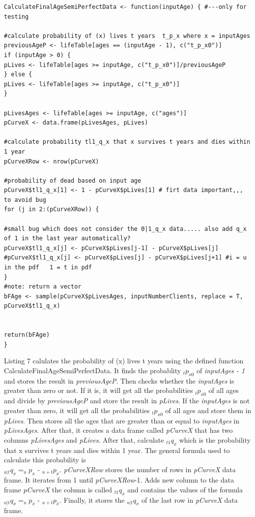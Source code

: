 \documentclass[12pt]{article}
\def\StartLineAtOne{\lstset{firstnumber=1}}
\begin{document}
\pagebreak
\StartLineAtOne
\begin{lstlisting}[caption={ Calculating $_{t}q_{x}$},captionpos=b]
CalculateFinalAgeSemiPerfectData <- function(inputAge) { #---only for testing

#calculate probability of (x) lives t years  t_p_x where x = inputAges
previousAgeP <- lifeTable[ages == (inputAge - 1), c("t_p_x0")]
if (inputAge > 0) {
pLives <- lifeTable[ages >= inputAge, c("t_p_x0")]/previousAgeP
} else {
pLives <- lifeTable[ages >= inputAge, c("t_p_x0")]
}

pLivesAges <- lifeTable[ages >= inputAge, c("ages")]
pCurveX <- data.frame(pLivesAges, pLives)

#calculate probability tl1_q_x that x survives t years and dies within 1 year
pCurveXRow <- nrow(pCurveX)

#probability of dead based on input age
pCurveX$tl1_q_x[1] <- 1 - pCurveX$pLives[1] # firt data important,,, to avoid bug
for (j in 2:(pCurveXRow)) {

#small bug which does not consider the 0|1_q_x data..... also add q_x of 1 in the last year automatically? 
pCurveX$tl1_q_x[j] <- pCurveX$pLives[j-1] - pCurveX$pLives[j]
#pCurveX$tl1_q_x[j] <- pCurveX$pLives[j] - pCurveX$pLives[j+1] #i = u in the pdf   1 = t in pdf
}
#note: return a vector
bFAge <- sample(pCurveX$pLivesAges, inputNumberClients, replace = T, pCurveX$tl1_q_x)


return(bFAge)
}
\end{lstlisting}
Listing 7 calulates the probability of (x) lives t years using the defined function CalculateFinalAgeSemiPerfectData. It finds the probablity $_{t}p_{x0}$ of \textit{inputAges - 1} and stores the result in \textit{previousAgeP}. Then checks whether the \textit{inputAges} is greater than zero or not. If it is, it will get all the probabilities $_{t}p_{x0}$ of all ages and divide by \textit{previousAgeP} and store the result in \textit{pLives}. If the \textit{inputAges} is not greater than zero, it will get all the probabilities $_{t}p_{x0}$ of all ages and store them in \textit{pLives}. Then stores all the ages that are greater than or equal to \textit{inputAges} in \textit{pLivesAges}. After that, it creates a data frame called \textit{pCurveX} that has two columns \textit{pLivesAges} and \textit{pLives}. After that, calculate $_{t1}q_{x}$ which is the probability that x survives t years and dies within 1 year. The general formula used to calculate this probability is\\ $_{u|t}q_{x}=_{u}p_{x}$ - $_{u+t}p_{x}$.  \textit{pCurveXRow} stores the number of rows in \textit{pCurveX} data frame. It iterates from 1 until \textit{pCurveXRow}-1. Adds new column to the data frame \textit{pCurveX} the column is called $_{t1}q_{x}$ and contains the values of the formula $_{u|t}q_{x}=_{u}p_{x}$ - $_{u+t}p_{x}$. Finally, it stores the $_{u|t}q_{x}$ of the last row in \textit{pCurveX} data frame.
\end{document}
